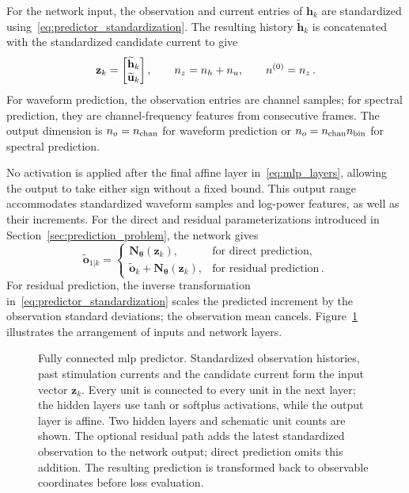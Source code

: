 For the network input, the observation and current entries of $\mathbf h_k$ are standardized using~\eqref{eq:predictor_standardization}.
The resulting history $\widetilde{\mathbf h}_k$ is concatenated with the standardized candidate current to give
\begin{equation}
    \mathbf{z}_k
    =
    \begin{bmatrix}
        \widetilde{\mathbf{h}}_k\\
        \widetilde{\mathbf{u}}_k
    \end{bmatrix},
    \qquad
    n_{z}=n_{h}+n_{u},
    \qquad n^{(0)}=n_{z}\,.
    \label{eq:mlp_input}
\end{equation}
For waveform prediction, the observation entries are channel samples; for spectral prediction, they are channel-frequency features from consecutive frames.
The output dimension is $n_{o}=n_{\mathrm{chan}}{}$ for waveform prediction or $n_{o}=n_{\mathrm{chan}}{} n_{\mathrm{bin}}{}$ for spectral prediction.

No activation is applied after the final affine layer in~\eqref{eq:mlp_layers}, allowing the output to take either sign without a fixed bound.
This output range accommodates standardized waveform samples and log-power features, as well as their increments.
For the direct and residual parameterizations introduced in Section~\ref{sec:prediction_problem}, the network gives
\begin{equation}
    \widetilde{\mathbf{o}}_{1|k}
    =
    \begin{cases}
        \mathbf{N}_{\boldsymbol{\theta}}(\mathbf{z}_k),
        & \text{for direct prediction},\\
        \widetilde{\mathbf{o}}_k
        +\mathbf{N}_{\boldsymbol{\theta}}(\mathbf{z}_k),
        & \text{for residual prediction}\,.
    \end{cases}
    \label{eq:mlp_output}
\end{equation}
For residual prediction, the inverse transformation in~\eqref{eq:predictor_standardization} scales the predicted increment by the observation standard deviations; the observation mean cancels.
Figure~\ref{fig:mlp_architecture} illustrates the arrangement of inputs and network layers.

\begin{figure}
    \centering
    
    \caption{Fully connected \ac{mlp} predictor.
    Standardized observation histories, past stimulation currents and the candidate current form the input vector $\mathbf{z}_k$.
    Every unit is connected to every unit in the next layer; the hidden layers use tanh or softplus activations, while the output layer is affine.
    Two hidden layers and schematic unit counts are shown.
    The optional residual path adds the latest standardized observation to the network output; direct prediction omits this addition.
    The resulting prediction is transformed back to observable coordinates before loss evaluation.}\label{fig:mlp_architecture}
\end{figure}

